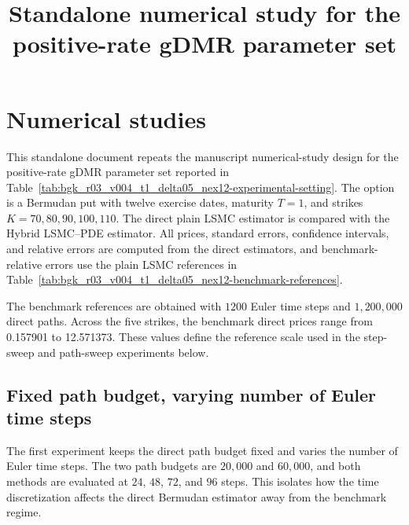 \documentclass[pdflatex,sn-mathphys-num]{sn-jnl}
\begin{document}
\title[Standalone numerical study for the positive-rate gDMR parameter set]{Standalone numerical study for the positive-rate gDMR parameter set}

\author[1]{ }
\author[1]{ }

\maketitle

\section{Numerical studies}

This standalone document repeats the manuscript numerical-study design for the positive-rate gDMR parameter set reported in Table~\ref{tab:bgk_r03_v004_t1_delta05_nex12-experimental-setting}. The option is a Bermudan put with twelve exercise dates, maturity \(T=1\), and strikes \(K=70,80,90,100,110\). The direct plain LSMC estimator is compared with the Hybrid LSMC--PDE estimator. All prices, standard errors, confidence intervals, and relative errors are computed from the direct estimators, and benchmark-relative errors use the plain LSMC references in Table~\ref{tab:bgk_r03_v004_t1_delta05_nex12-benchmark-references}.



The benchmark references are obtained with \(1200\) Euler time steps and \(1,200,000\) direct paths. Across the five strikes, the benchmark direct prices range from 0.157901 to 12.571373. These values define the reference scale used in the step-sweep and path-sweep experiments below.



\subsection{Fixed path budget, varying number of Euler time steps}

The first experiment keeps the direct path budget fixed and varies the number of Euler time steps. The two path budgets are \(20,000\) and \(60,000\), and both methods are evaluated at \(24\), \(48\), \(72\), and \(96\) steps. This isolates how the time discretization affects the direct Bermudan estimator away from the benchmark regime.
\end{document}
